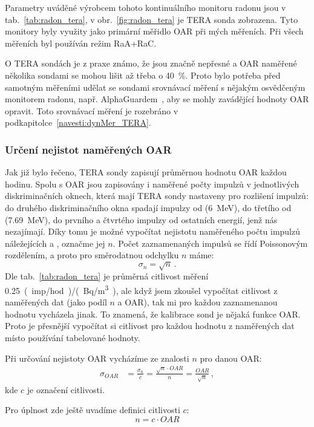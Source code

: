 Parametry uváděné výrobcem tohoto kontinuálního monitoru radonu jsou v tab.~\ref{tab:radon_tera}, v obr.~\ref{fig:radon_tera} je TERA sonda zobrazena. Tyto monitory byly využity jako primární měřidlo OAR při mých měřeních. Při všech měřeních byl používán režim RaA+RaC.

O TERA sondách je z praxe známo, že jsou značně nepřesné a OAR naměřené několika sondami se mohou lišit až třeba o 40~\%. Proto bylo potřeba před samotným měřeními udělat se sondami srovnávací měření s nějakým osvědčeným monitorem radonu, např. AlphaGuardem~\cite{alphaguard}, aby se mohly zavádějící hodnoty OAR opravit. Toto srovnávací měření je rozebráno v podkapitolce~\ref{navesti:dynMer_TERA}.

\subsubsection{Určení nejistot naměřených OAR}
Jak již bylo řečeno, TERA sondy zapisují průměrnou hodnotu OAR každou hodinu. Spolu s OAR jsou zapisovány i naměřené počty impulzů v jednotlivých diskriminačních oknech, která mají TERA sondy nastaveny pro rozlišení impulzů: do druhého diskriminačního okna spadají impulzy od  (\SI{6}{MeV}), do třetího od  (\SI{7.69}{MeV}), do prvního a čtvrtého impulzy od ostatních energií, jenž nás nezajímají. Díky tomu je možné vypočítat nejistotu naměřeného počtu impulzů náležejících  a , označme jej $n$. Počet zaznamenaných impulsů se řídí Poissonovým rozdělením, a proto pro směrodatnou odchylku $n$ máme:
\begin{equation}
    \sigma_n=\sqrt{n}\,.
    \label{eq:radon_n_odchylka}
\end{equation}
Dle tab.~\ref{tab:radon_tera} je průměrná citlivost měření \SI{0.25}{(imp/hod)/(Bq/m^3)}, ale když jsem zkoušel vypočítat citlivost z naměřených dat (jako podíl $n$ a OAR), tak mi pro každou zaznamenanou hodnotu vycházela jinak. To znamená, že kalibrace sond je nějaká funkce OAR. Proto je přesnější vypočítat si citlivost pro každou hodnotu z naměřených dat místo používání tabelované hodnoty.

Při určování nejistoty OAR vycházíme ze znalosti $n$ pro danou OAR:
\begin{align}
    \sigma_{OAR}&=\frac{\sigma_n}{c}=\frac{\sqrt{n}\cdot OAR}{n}=\frac{OAR}{\sqrt{n}}\,,
    \label{eq:radon_OAR_odchylka}
\end{align}
kde $c$ je označení citlivosti.

Pro úplnost zde ještě uvadíme definici citlivosti $c$:
\begin{equation}
    n=c\cdot OAR
    \label{eq:radon_citlivost}
\end{equation}

